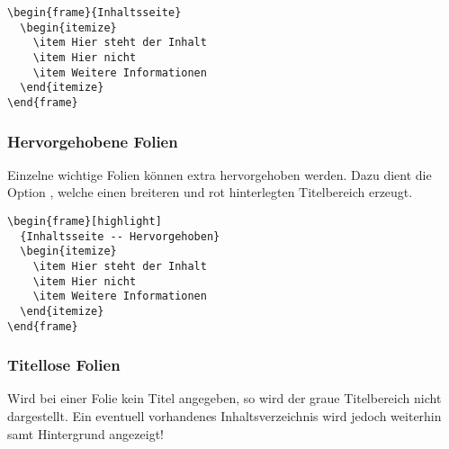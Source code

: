 \begin{minipage}{0.5\textwidth}
\begin{verbatim}
\begin{frame}{Inhaltsseite}
  \begin{itemize}
    \item Hier steht der Inhalt
    \item Hier nicht
    \item Weitere Informationen
  \end{itemize}
\end{frame}
\end{verbatim}
\end{minipage}
\begin{minipage}{0.5\textwidth}
\end{minipage}

\subsubsection{Hervorgehobene Folien}

Einzelne wichtige Folien können extra hervorgehoben werden.
Dazu dient die Option ,
welche einen breiteren und rot hinterlegten Titelbereich erzeugt.

\begin{minipage}{0.5\textwidth}
\begin{verbatim}
\begin{frame}[highlight]
  {Inhaltsseite -- Hervorgehoben}
  \begin{itemize}
    \item Hier steht der Inhalt
    \item Hier nicht
    \item Weitere Informationen
  \end{itemize}
\end{frame}
\end{verbatim}
\end{minipage}
\begin{minipage}{0.5\textwidth}
\end{minipage}

\subsubsection{Titellose Folien}

Wird bei einer Folie kein Titel angegeben, so wird der graue Titelbereich
nicht dargestellt.
Ein eventuell vorhandenes Inhaltsverzeichnis wird jedoch weiterhin samt
Hintergrund angezeigt!

